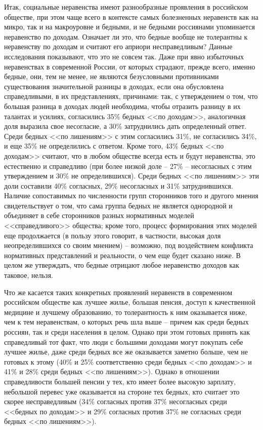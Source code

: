 Итак, социальные неравенства имеют разнообразные проявления в российском 
обществе, при этом чаще всего в контексте самых болезненных неравенств как на 
микро, так и на макроуровне и бедными, и не бедными россиянами упоминается 
неравенство по доходам. Означает ли это, что бедные вообще не толерантны к 
неравенству по доходам и считают его априори несправедливым? Данные 
исследования показывают, что это не совсем так. Даже при явно избыточных 
неравенствах в современной России, от которых страдают, прежде всего, именно 
бедные, они, тем не менее, не являются безусловными противниками существования 
значительной разницы в доходах, если она обусловлена справедливыми, в их 
представлениях, причинами: так, с утверждением о том, что большая разница в 
доходах людей необходима, чтобы отразить разницу в их талантах и усилиях, 
согласились 35\% бедных <<по доходам>>, аналогичная доля выразила свое 
несогласие, а 30\% затруднились дать определенный ответ. Среди бедных <<по 
лишениям>> с этим согласились 31\%, не согласились 34\%, и еще 35\% не 
определились с ответом. Кроме того, 43\% бедных <<по доходам>> считают, что в 
любом обществе всегда есть и будут неравенства, это естественно и справедливо 
(при более низкой доле -- 27\% -- несогласных с этим утверждением и 30\% не 
определившихся). Среди бедных <<по лишениям>> эти доли составили 40\% 
согласных, 29\% несогласных и 31\% затруднившихся. Наличие сопоставимых по 
численности групп сторонников того и другого мнения свидетельствует о том, что 
сама группа бедных не является однородной и объединяет в себе сторонников 
разных нормативных моделей <<справедливого>> общества; кроме того, процесс 
формирования этих моделей еще продолжается (в пользу этого говорит, в 
частности, высокая доля неопределившихся со своим мнением) -- возможно, под 
воздействием конфликта нормативных представлений и реальности, о чем еще будет 
сказано ниже. В целом же утверждать, что бедные отрицают любое неравенство 
доходов как таковое, нельзя.

Что же касается таких конкретных проявлений неравенств в современном 
российском обществе как лучшее жилье, большая пенсия, доступ к качественной 
медицине и лучшему образованию, то толерантность к ним оказывается ниже, чем к 
тем неравенствам, о которых речь шла выше -- причем как среди бедных россиян, 
так и среди населения в целом. Однако при этом готовых принять как 
справедливый тот факт, что люди с большими доходами могут покупать себе лучшее 
жилье, даже среди бедных все же оказывается заметно больше, чем не готовых к 
этому (40\% и 25\% соответственно среди бедных <<по доходам>> и 41\% и 28\% 
среди бедных <<по лишениям>>). Однако в отношении справедливости большей 
пенсии у тех, кто имеет более высокую зарплату, небольшой перевес уже 
оказывается на стороне тех бедных, кто считает это скорее несправедливым 
(34\% согласных против 37\% несогласных среди <<бедных по доходам>> и 29\% 
согласных против 37\% не согласных среди бедных <<по лишениям>>).


